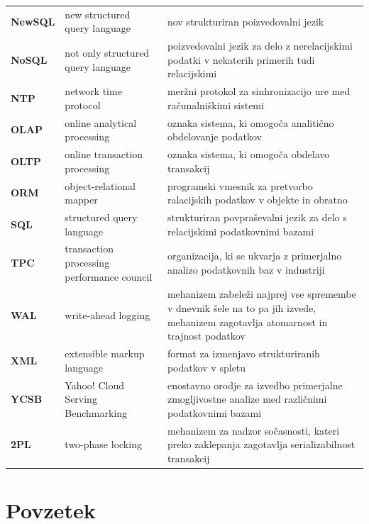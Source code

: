 \documentclass[a4paper, 12pt]{book}
\newcommand{\clearemptydoublepage}{\newpage{\pagestyle{empty}\cleardoublepage}}
\begin{document}
\begin{longtable}{p{}|p{}|p{}}
    {\bf NewSQL}& new structured query language
        & nov strukturiran poizvedovalni jezik
        \\
    {\bf NoSQL} & not only structured query language
        & poizvedovalni jezik za delo z nerelacijskimi podatki v nekaterih primerih tudi relacijskimi
        \\
    {\bf NTP} & network time protocol
        & meržni protokol za sinhronizacijo ure med računalniškimi sistemi
        \\
    {\bf OLAP}  & online analytical processing
        & oznaka sistema, ki omogoča analitično obdelovanje podatkov
        \\
    {\bf OLTP}  & online transaction processing
        & oznaka sistema, ki omogoča obdelavo transakcij
        \\
    {\bf ORM}   & object-relational mapper
        & programski vmesnik za pretvorbo ralacijskih podatkov v objekte in obratno
        \\
    {\bf SQL}   & structured query language    
        & strukturiran povpraševalni jezik za delo s relacijskimi podatkovnimi bazami
        \\
    {\bf TPC}   & transaction processing performance council
        &  organizacija, ki se ukvarja z primerjalno analizo podatkovnih baz v industriji
        \\
    {\bf WAL}   & write-ahead logging
        & mehanizem zabeleži najprej vse spremembe v dnevnik šele na to pa jih izvede, mehanizem zagotavlja atomarnost in trajnost podatkov 
        \\
    {\bf XML}   & extensible markup language
        & format za izmenjavo strukturiranih podatkov v spletu
        \\
    {\bf YCSB}  & Yahoo! Cloud Serving Benchmarking
        & enostavno orodje za izvedbo primerjalne zmogljivostne analize med različnimi podatkovnimi bazami
        \\
    {\bf 2PL} & two-phase locking
        & mehanizem za nadzor sočasnosti, kateri preko zaklepanja zagotavlja serializabilnost transakcij
        \\
\end{longtable}


\clearemptydoublepage

\chapter*{Povzetek}
\end{document}
